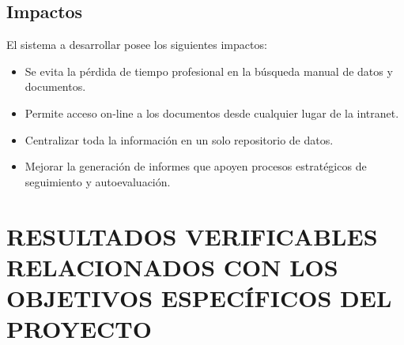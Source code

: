 \documentclass[12pt]{article}
\renewcommand{\refname}{Referencias}
\begin{document}
 
		\subsection{Impactos}
			El sistema a desarrollar posee los siguientes impactos:
		\begin{itemize}
		\item Se evita la pérdida de tiempo profesional en la búsqueda manual de datos y   documentos. 
		\item  Permite acceso on-line a los documentos desde cualquier lugar de la intranet.
		\item Centralizar toda la información en un solo repositorio de datos.
		\item Mejorar la generación de informes que apoyen procesos estratégicos de seguimiento y autoevaluación.
			
		\end{itemize}
		
		
		\renewcommand{\refname}{REFERENCIAS}
		
		
		
\newpage
\section{RESULTADOS VERIFICABLES RELACIONADOS CON LOS  OBJETIVOS ESPECÍFICOS DEL \\ PROYECTO}
\end{document}

